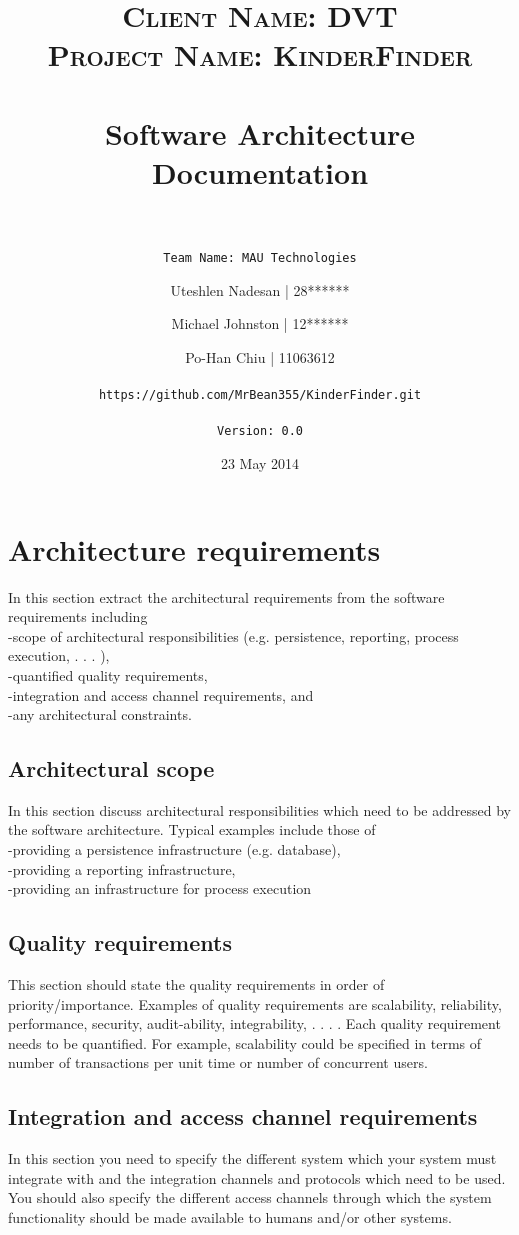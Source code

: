 \documentclass[11pt,titlepage]{article} %
\title{
		\normalfont \normalsize \textsc{Client Name: DVT} \\
		\normalfont \normalsize \textsc{Project Name: KinderFinder} \\ [25pt]
		\horrule{0.5pt} \\[0.4cm]
		\huge Software Architecture Documentation \\
		\horrule{2pt} \\[0.5cm]
}
\author{\texttt{Team Name: MAU Technologies}
 \\[0.5cm] \and Uteshlen Nadesan | 28******
 \and Michael Johnston | 12******
 \and Po-Han Chiu | 11063612
 \\ \\ \texttt{https://github.com/MrBean355/KinderFinder.git}
 \\ \\ \texttt{Version: 0.0}}
\date{23 May 2014}
\begin{document}
\maketitle
\tableofcontents
\newpage

\section{Architecture requirements}
In this section extract the architectural requirements from the software requirements including
\\-scope of architectural responsibilities (e.g. persistence, reporting, process execution, . . . ),
\\-quantified quality requirements,
\\-integration and access channel requirements, and
\\-any architectural constraints.
\subsection{Architectural scope}
In this section discuss architectural responsibilities which need to be addressed by the software
architecture. Typical examples include those of
\\-providing a persistence infrastructure (e.g. database),
\\-providing a reporting infrastructure,
\\-providing an infrastructure for process execution
\subsection{Quality requirements}
This section should state the quality requirements in order of priority/importance. Examples of
quality requirements are scalability, reliability, performance, security, audit-ability, integrability, . . . .
Each quality requirement needs to be quantified. For example, scalability could be specified in
terms of number of transactions per unit time or number of concurrent users.
\subsection{Integration and access channel requirements}
In this section you need to specify the different system which your system must integrate with and
the integration channels and protocols which need to be used.
You should also specify the different access channels through which the system functionality
should be made available to humans and/or other systems.
\end{document}
